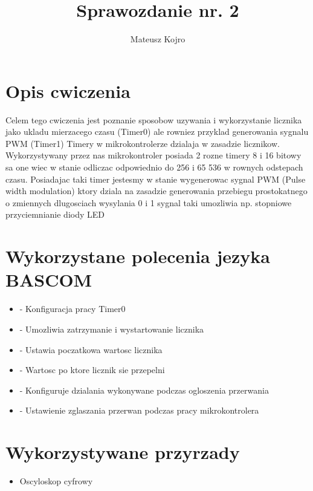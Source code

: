 \documentclass{article}
\title{Sprawozdanie nr. 2}
\author{Mateusz Kojro}
\date{}
\begin{document}
\maketitle

\section{Opis cwiczenia}

Celem tego cwiczenia jest poznanie sposobow uzywania i wykorzystanie licznika jako
ukladu mierzacego czasu (Timer0) ale rowniez przyklad generowania sygnalu PWM (Timer1)
Timery w mikrokontrolerze dzialaja w zasadzie licznikow. Wykorzystywany przez nas mikrokontroler
posiada 2 rozne timery 8 i 16 bitowy sa one wiec w stanie odliczac odpowiednio do
256 i 65 536 w rownych odstepach czasu. Posiadajac taki timer jestesmy w stanie
wygenerowac sygnal PWM (Pulse width modulation) ktory dziala na zasadzie 
generowania przebiegu prostokatnego o zmiennych dlugosciach wysylania 0 i 1
sygnal taki umozliwia np. stopniowe przyciemnianie diody LED

\section{Wykorzystane polecenia jezyka BASCOM}
\begin{itemize}
  \item {} - Konfiguracja pracy Timer0
  \item {} - Umozliwia zatrzymanie i wystartowanie licznika
  \item {} - Ustawia poczatkowa wartosc licznika
  \item {} - Wartosc po ktore licznik sie przepelni
  \item {} - Konfiguruje dzialania wykonywane podczas ogloszenia przerwania
  \item {} - Ustawienie zglaszania przerwan podczas pracy mikrokontrolera
\end{itemize}

\section{Wykorzystywane przyrzady}
\begin{itemize}
  \item Oscyloskop cyfrowy
\end{itemize}
\end{document}
